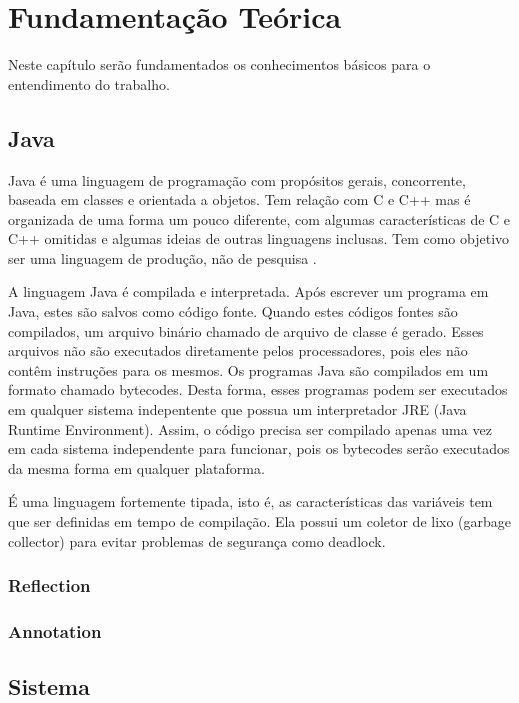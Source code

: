 \chapter{Fundamentação Teórica}
\label{ch:fundamentacao}
\par Neste capítulo ser\~ao fundamentados os conhecimentos b\'asicos para o entendimento do trabalho.


\section{Java}

\par Java é uma linguagem de programação com propósitos gerais, concorrente, baseada em classes e orientada a objetos. Tem relação com C e C++ mas é organizada de uma forma um pouco diferente, com algumas características de C e C++ omitidas e algumas ideias de outras linguagens inclusas. Tem como objetivo ser uma linguagem de produção, não de pesquisa \cite{joy2000java}.
\par A linguagem Java é compilada e interpretada. Após escrever um programa em Java, estes são salvos como código fonte. Quando estes códigos fontes são compilados, um arquivo binário chamado de arquivo de classe é gerado. Esses arquivos não são executados diretamente pelos processadores, pois eles não contêm instruções para os mesmos. Os programas Java são compilados em um formato chamado bytecodes. Desta forma, esses programas podem ser executados em qualquer sistema indepentente que possua um interpretador JRE (Java Runtime Environment). Assim, o código precisa ser compilado apenas uma vez em cada sistema independente para funcionar, pois os bytecodes serão executados da mesma forma em qualquer plataforma\cite{indrusiak1996linguagem}.
\par É uma linguagem fortemente tipada, isto é, as características das variáveis tem que ser definidas em tempo de compilação. Ela possui um coletor de lixo (garbage collector) para evitar problemas de segurança como deadlock. \cite{joy2000java}

\subsection{Reflection}

\subsection{Annotation}

\section{Sistema}

